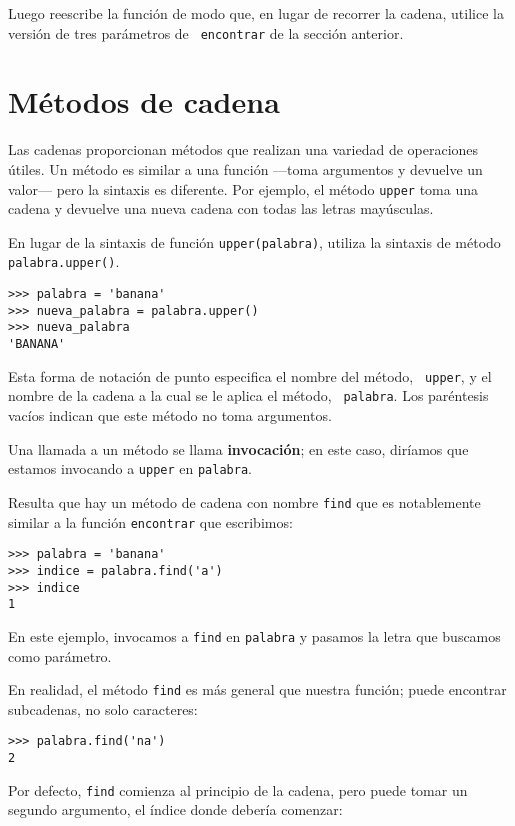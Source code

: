 \documentclass[10pt]{book}
\begin{document}
Luego reescribe la función de modo que, en lugar de
recorrer la cadena, utilice la versión de tres parámetros de {\tt
encontrar} de la sección anterior.


\section{Métodos de cadena}
\label{optional}

Las cadenas proporcionan métodos que realizan una variedad de operaciones útiles.
Un método es similar a una función ---toma argumentos y
devuelve un valor--- pero la sintaxis es diferente.  Por ejemplo, el
método {\tt upper} toma una cadena y devuelve una nueva cadena con
todas las letras mayúsculas.

En lugar de la sintaxis de función {\tt upper(palabra)}, utiliza
la sintaxis de método {\tt palabra.upper()}.

\begin{verbatim}
>>> palabra = 'banana'
>>> nueva_palabra = palabra.upper()
>>> nueva_palabra
'BANANA'
\end{verbatim}
%
Esta forma de notación de punto especifica el nombre del método, {\tt
upper}, y el nombre de la cadena a la cual se le aplica el método, {\tt
palabra}.  Los paréntesis vacíos indican que este método no toma
argumentos.

Una llamada a un método se llama {\bf invocación}; en este caso,
diríamos que estamos invocando a {\tt upper} en {\tt palabra}.

Resulta que hay un método de cadena con nombre {\tt find} que
es notablemente similar a la función {\tt encontrar} que escribimos:

\begin{verbatim}
>>> palabra = 'banana'
>>> indice = palabra.find('a')
>>> indice
1
\end{verbatim}
%
En este ejemplo, invocamos a {\tt find} en {\tt palabra} y pasamos
la letra que buscamos como parámetro.

En realidad, el método {\tt find} es más general que nuestra función;
puede encontrar subcadenas, no solo caracteres:

\begin{verbatim}
>>> palabra.find('na')
2
\end{verbatim}
%
Por defecto, {\tt find} comienza al principio de la cadena, pero
puede tomar un segundo argumento, el índice donde debería comenzar:
\end{document}
